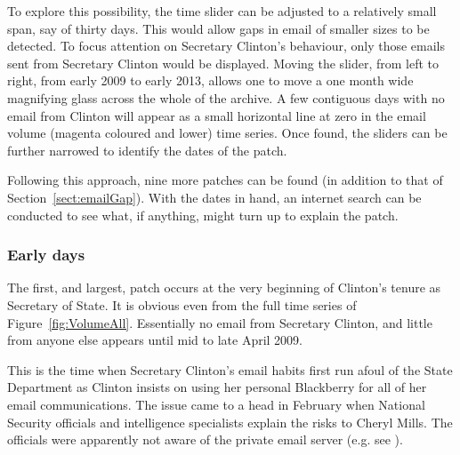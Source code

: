 \documentclass[journal]{vgtc}                %
\begin{document}
To explore this possibility,  the time slider can be adjusted to a relatively small span, say of thirty days.  This would allow gaps in email of smaller sizes to be detected.  To focus attention on Secretary Clinton's behaviour, only those emails sent from Secretary Clinton would be displayed.  
Moving the slider, from left to right, from early 2009 to early 2013, allows one to move a one month wide magnifying glass across the whole of the archive.  A few contiguous days with no email from Clinton will appear as a small horizontal line at zero in the email volume (magenta coloured and lower) time series.  Once found, the sliders can be further narrowed to identify the dates of the patch.

Following this approach, nine %
more patches can be found (in addition to that of Section~\ref{sect:emailGap}).  With the dates in hand, an internet search can be conducted to see what, if anything, might turn up to explain the patch.
\subsubsection{Early days}
\label{sect:youHaveNoMail}
The first, and largest, patch occurs at the very beginning of Clinton's tenure as Secretary of State.  It is  obvious even from the full time series of Figure~\ref{fig:VolumeAll}.  Essentially no email from Secretary Clinton, and little from anyone else appears until mid to late April 2009.  

This is the time when Secretary Clinton's email habits first run afoul of the State Department as Clinton insists on using her personal Blackberry for all of her email communications.  The issue came to a head in February when National Security officials and intelligence specialists explain the risks to Cheryl Mills.  The officials were apparently not aware  of the private email server (e.g. see \cite{TakingRootWashPost}).  
\end{document}
